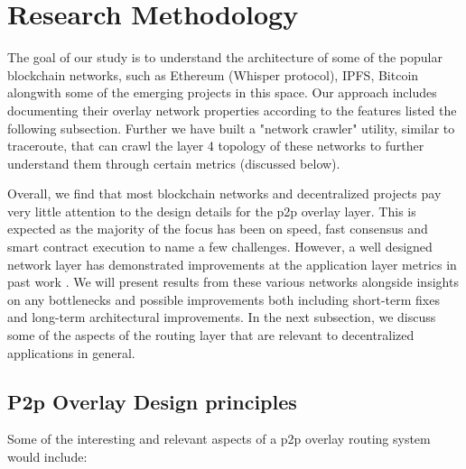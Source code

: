 \documentclass[journal]{IEEEtran}
\begin{document}
\section{Research Methodology}
\label{sec:res}
The goal of our study is to understand the architecture of some of the popular blockchain networks, such as Ethereum
(Whisper protocol), IPFS, Bitcoin alongwith some of the emerging projects in this space. Our approach includes
documenting their overlay network properties according to the features listed the following subsection. Further we have
built a "network crawler" utility, similar to traceroute, that can crawl the layer 4 topology of these networks to
further understand them through certain metrics (discussed below).

Overall, we find that most blockchain networks and decentralized projects pay very little attention to the design
details for the p2p overlay layer. This is expected as the majority of the focus has been on speed, fast consensus and
smart contract execution to name a few challenges. However, a well designed network layer has demonstrated improvements
at the application layer metrics in past work \cite{tapestry2004, farsite, oceanstore, past}. We will present results
from these various networks alongside insights on any bottlenecks and possible improvements both including short-term
fixes and long-term architectural improvements. In the next subsection, we discuss some of the aspects of the routing
layer that are relevant to decentralized applications in general.

\subsection{P2p Overlay Design principles}
Some of the interesting and relevant aspects of a p2p overlay routing system would include:
\end{document}
